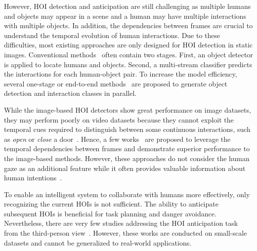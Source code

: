 \documentclass[times,twocolumn,final,authoryear]{elsarticle}
\begin{document}
However, HOI detection and anticipation are still challenging as multiple humans and objects may appear in a scene and a human may have multiple interactions with multiple objects. In addition, the dependencies between frames are crucial to understand the temporal evolution of human interactions. Due to these difficulties, most existing approaches are only designed for HOI detection in static images. Conventional methods~\citep{hoi_i2:visual_semantic, hoi_i2:language_prior, hoi_i2:learning_hico, hoi_i2:ican, hoi_i2:detecting_recognizing, hoi_i2:neural_motifs, hoi_i2:reidn, hoi_i2:interact_intend, hoi_i2:gpsnet} often contain two stages. First, an object detector is applied to locate humans and objects. Second, a multi-stream classifier predicts the interactions for each human-object pair. To increase the model efficiency, several one-stage or end-to-end methods~\citep{hoi_i1:learning_interaction_point, hoi_i1:ppdm, hoi_i1:hotr, hoi_i1:qpic} are proposed to generate object detection and interaction classes in parallel.

While the image-based HOI detectors show great performance on image datasets, they may perform poorly on video datasets because they cannot exploit the temporal cues required to distinguish between some continuous interactions, such as \emph{open} or \emph{close} a door~\citep{hoi_v_set:vlog}. Hence, a few works~\citep{hoi_v2:learning_gpn, hoi_v_set:VidHOI, hoi_v2:sttran, hoi_v2:detecting_hort, hoi_v2:st_gpn, hoi_v2:tubelet_tokens} are proposed to leverage the temporal dependencies between frames and demonstrate superior performance to the image-based methods. However, these approaches do not consider the human gaze as an additional feature while it often provides valuable information about human intentions~\citep{eye:eye_hand_coordination, eye:what_ways, eye:visual_memory, eye:landscape, eye:planning_precise}.

To enable an intelligent system to collaborate with humans more effectively, only recognizing the current HOIs is not sufficient. The ability to anticipate subsequent HOIs is beneficial for task planning and danger avoidance. Nevertheless, there are very few studies addressing the HOI anticipation task from the third-person view~\citep{hoi_v_anti:srnn, hoi_v_anti:red, hoi_v_anti:structured_lstm, hoi_v_anti:lighten}. However, these works are conducted on small-scale datasets and cannot be generalized to real-world applications. 
\end{document}
